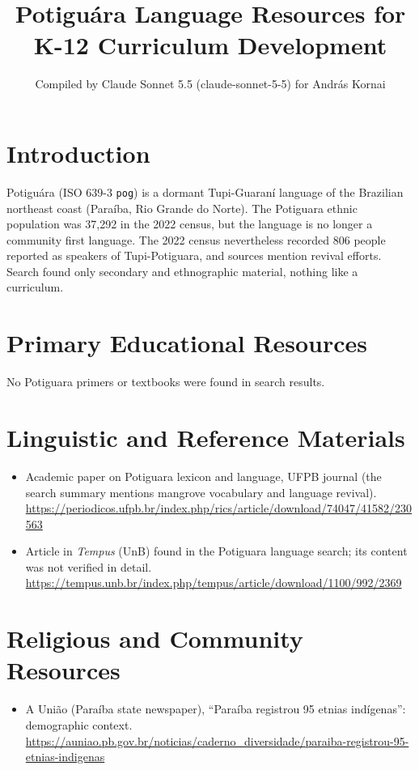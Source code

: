 \documentclass[12pt]{article}
\title{Potigu\'ara Language Resources for K-12 Curriculum Development}
\author{Compiled by Claude Sonnet 5.5 (claude-sonnet-5-5) for Andr\'as Kornai}
\date{}
\begin{document}
\maketitle

\section{Introduction}
Potigu\'ara (ISO 639-3 \texttt{pog}) is a dormant Tupi-Guaran\'i language of the Brazilian northeast coast (Para\'iba, Rio Grande do Norte). The Potiguara ethnic population was 37,292 in the 2022 census, but the language is no longer a community first language. The 2022 census nevertheless recorded 806 people reported as speakers of Tupi-Potiguara, and sources mention revival efforts. Search found only secondary and ethnographic material, nothing like a curriculum.

\section{Primary Educational Resources}
No Potiguara primers or textbooks were found in search results.

\section{Linguistic and Reference Materials}
\begin{itemize}
\item Academic paper on Potiguara lexicon and language, UFPB journal (the search summary mentions mangrove vocabulary and language revival). \url{https://periodicos.ufpb.br/index.php/rics/article/download/74047/41582/230563}
\item Article in \emph{Tempus} (UnB) found in the Potiguara language search; its content was not verified in detail. \url{https://tempus.unb.br/index.php/tempus/article/download/1100/992/2369}
\end{itemize}

\section{Religious and Community Resources}
\begin{itemize}
\item A Uni\~ao (Para\'iba state newspaper), ``Para\'iba registrou 95 etnias ind\'igenas'': demographic context. \url{https://auniao.pb.gov.br/noticias/caderno_diversidade/paraiba-registrou-95-etnias-indigenas}
\end{itemize}
\end{document}
